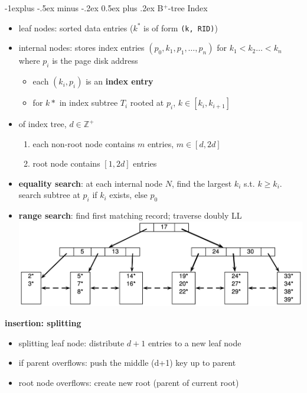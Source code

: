 \documentclass[10pt, landscape]{article}
\makeatletter
\renewcommand{\subsection}{\@startsection{subsection}{2}{0mm}%
  {-1explus -.5ex minus -.2ex}%
  {0.5ex plus .2ex}%
{\normalfont\normalsize\bfseries}}
\makeatother
\begin{document}
\begin{multicols*}{4}
  \subsection{B$^+$-tree Index}

  \begin{itemize}
    \item leaf nodes: sorted data entries ($k^*$ is of form \texttt{(k, RID)})
    \item internal nodes: stores index entries $(p_0, k_1, p_1, \dots, p_n)$ for $k_1 < k_2 \dots <k_n$ where $p_i$ is the page disk address
      \begin{itemize}
        \item each $(k_i, p_i)$ is an \textbf{index entry}
        \item for $k*$ in index subtree $T_i$ rooted at $p_i$, $k \in [k_i, k_{i+1}]$
      \end{itemize}
    \item {} of index tree, $d \in \mathbb{Z}^+$
      \begin{enumerate}
        \item each non-root node contains $m$ entries, $m \in [d, 2d]$
        \item root node contains $[1, 2d]$ entries
      \end{enumerate}
    \item \textbf{equality search}: at each internal node $N$, find the largest $k_i$ s.t. $k \geq k_i$. search subtree at $p_i$ if $k_i$ exists, else $p_0$ 
    \item \textbf{range search}: find first matching record; traverse doubly LL
      \includegraphics[width=0.9\linewidth]{cs3223-b-tree.png} 
  \end{itemize}

  \textbf{insertion: splitting}
  \begin{itemize}
    \item splitting leaf node: distribute $d+1$ entries to a new leaf node
    \item if parent overflows: push the middle (d+1) key up to parent
    \item root node overflows: create new root (parent of current root)
  \end{itemize}


\end{multicols*}
\end{document}
